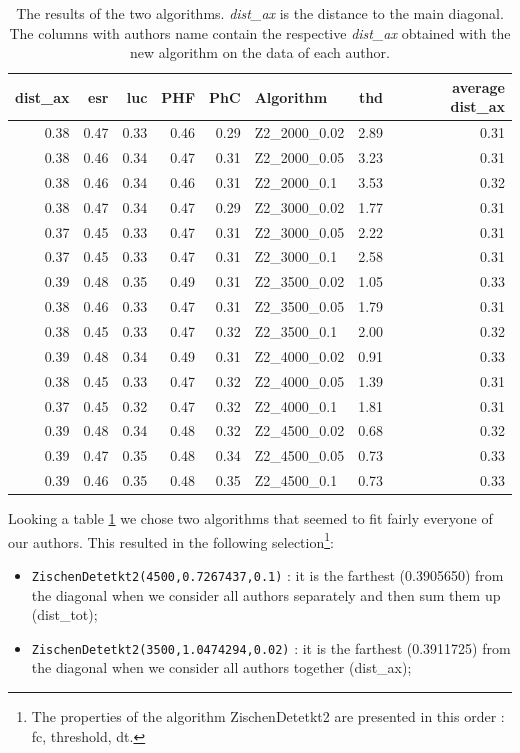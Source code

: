 \documentclass{article}\usepackage[]{graphicx}\usepackage[]{color}
\begin{document}
\begin{table}
\centering
\begin{tabular}{r|r|r|r|r|l|r|r}
dist{\_}ax & esr & luc & PHF & PhC & Algorithm & thd & average dist{\_}ax\\
  \hline
0.38 & 0.47 & 0.33 & 0.46 & 0.29 & Z2\_2000\_0.02 & 2.89 & 0.31 \\ 
  0.38 & 0.46 & 0.34 & 0.47 & 0.31 & Z2\_2000\_0.05 & 3.23 & 0.31 \\ 
  0.38 & 0.46 & 0.34 & 0.46 & 0.31 & Z2\_2000\_0.1 & 3.53 & 0.32 \\ 
  0.38 & 0.47 & 0.34 & 0.47 & 0.29 & Z2\_3000\_0.02 & 1.77 & 0.31 \\ 
  0.37 & 0.45 & 0.33 & 0.47 & 0.31 & Z2\_3000\_0.05 & 2.22 & 0.31 \\ 
  0.37 & 0.45 & 0.33 & 0.47 & 0.31 & Z2\_3000\_0.1 & 2.58 & 0.31 \\ 
  0.39 & 0.48 & 0.35 & 0.49 & 0.31 & Z2\_3500\_0.02 & 1.05 & 0.33 \\ 
  0.38 & 0.46 & 0.33 & 0.47 & 0.31 & Z2\_3500\_0.05 & 1.79 & 0.31 \\ 
  0.38 & 0.45 & 0.33 & 0.47 & 0.32 & Z2\_3500\_0.1 & 2.00 & 0.32 \\ 
  0.39 & 0.48 & 0.34 & 0.49 & 0.31 & Z2\_4000\_0.02 & 0.91 & 0.33 \\ 
  0.38 & 0.45 & 0.33 & 0.47 & 0.32 & Z2\_4000\_0.05 & 1.39 & 0.31 \\ 
  0.37 & 0.45 & 0.32 & 0.47 & 0.32 & Z2\_4000\_0.1 & 1.81 & 0.31 \\ 
  0.39 & 0.48 & 0.34 & 0.48 & 0.32 & Z2\_4500\_0.02 & 0.68 & 0.32 \\ 
  0.39 & 0.47 & 0.35 & 0.48 & 0.34 & Z2\_4500\_0.05 & 0.73 & 0.33 \\ 
  0.39 & 0.46 & 0.35 & 0.48 & 0.35 & Z2\_4500\_0.1 & 0.73 & 0.33 \\ 
   \hline

\end{tabular}
\caption{The results of the two algorithms. {\it dist{\_}ax} is the distance to the main diagonal. The columns with authors name contain the respective {\it dist{\_}ax} obtained with the new algorithm on the data of each author.}
\label{tab:submaous}
\end{table}
Looking a table \ref{tab:submaous} we chose two algorithms that seemed to fit fairly everyone of our authors. This resulted in the following selection\footnote{The properties of the algorithm ZischenDetetkt2 are presented in this order : fc, threshold, dt.}:
\begin{itemize}
\item {\tt ZischenDetetkt2(4500,0.7267437,0.1)} : it is the farthest (0.3905650) from the diagonal when we consider all authors separately and then sum them up (dist{\_}tot);
\item {\tt ZischenDetetkt2(3500,1.0474294,0.02)} : it is the farthest (0.3911725) from the diagonal when we consider all authors together (dist{\_}ax);
\end{itemize}
\end{document}
